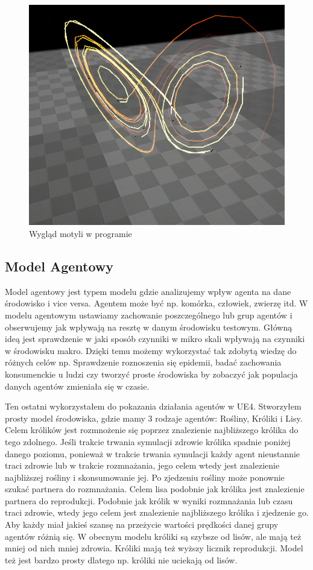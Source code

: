 \documentclass[a4paper,12pt,reqno]{article}
\begin{document}
\begin{figure}[H]%
\centering
\includegraphics[width=0.7\columnwidth]{graphics/butterfly/ButterflyInUE_1.png}
\caption{Wygląd motyli w programie
\label{BPExample}}%
%
\qquad
\end{figure}  

\subsection{Model Agentowy}

Model agentowy jest typem modelu gdzie analizujemy wpływ agenta na dane środowisko i vice versa. Agentem może być np. komórka, człowiek, zwierzę itd. W modelu agentowym ustawiamy zachowanie poszczególnego lub grup agentów i obserwujemy jak wpływają na resztę w danym środowisku testowym. Główną ideą jest sprawdzenie w jaki sposób czynniki w mikro skali wpływają na czynniki w środowisku makro. Dzięki temu możemy wykorzystać tak zdobytą wiedzę do różnych celów np. Sprawdzenie roznoszenia się epidemii, badać zachowania konsumenckie u ludzi czy tworzyć proste środowiska  by zobaczyć jak populacja danych agentów zmieniała się w czasie.\cite{agent_examples} 

Ten ostatni wykorzystałem do pokazania działania agentów w UE4. Stworzyłem prosty model środowiska, gdzie mamy 3 rodzaje agentów: Rośliny, Króliki i Lisy. Celem królików jest rozmnożenie się poprzez znalezienie najbliższego królika do tego zdolnego. Jeśli trakcie trwania symulacji zdrowie królika spadnie poniżej danego poziomu, ponieważ w trakcie trwania symulacji każdy agent nieustannie traci zdrowie lub w trakcie rozmnażania, jego celem wtedy jest znalezienie najbliższej rośliny i skonsumowanie jej. Po zjedzeniu rośliny może ponownie szukać partnera do rozmnażania.  Celem lisa podobnie jak królika jest znalezienie partnera do reprodukcji. Podobnie jak królik w wyniki rozmnażania lub czasu traci zdrowie, wtedy jego celem jest znalezienie najbliższego królika i zjedzenie go. Aby każdy miał jakieś szansę na przeżycie wartości prędkości danej grupy agentów różnią się. W obecnym modelu króliki są szybsze od lisów, ale mają też mniej od nich mniej zdrowia. Króliki mają też wyższy licznik reprodukcji. Model też jest bardzo prosty dlatego np. króliki nie uciekają od lisów.
\end{document}
